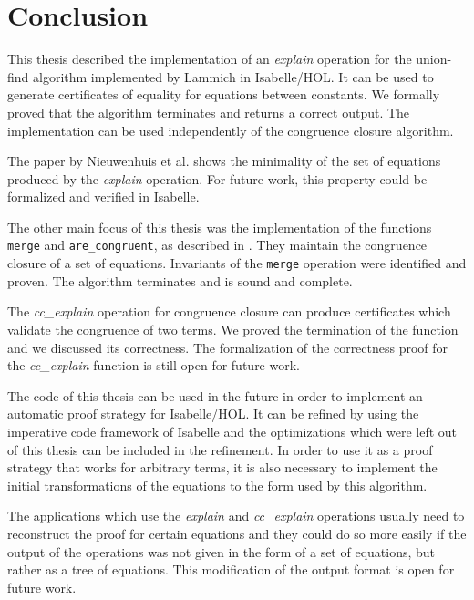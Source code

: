 
\chapter{Conclusion}\label{chapter:conclusion}

This thesis described the implementation of an \emph{explain} operation for the union-find algorithm implemented by Lammich \cite{unionfind-isabelle} in Isabelle/HOL. It can be used to generate certificates of equality for equations between constants. We formally proved that the algorithm terminates and returns a correct output. The implementation can be used independently of the congruence closure algorithm.

The paper by Nieuwenhuis et al. \cite{Nieuwenhuis} shows the minimality of the set of equations produced by the \emph{explain} operation. For future work, this property could be formalized and verified in Isabelle.

The other main focus of this thesis was the implementation of the functions \lstinline|merge| and \lstinline|are_congruent|, as described in \cite{Nieuwenhuis}. They maintain the congruence closure of a set of equations. Invariants of the \lstinline|merge| operation were identified and proven. The algorithm terminates and is sound and complete.

The \emph{cc\_explain} operation for congruence closure can produce certificates which validate the congruence of two terms. We proved the termination of the function and we discussed its correctness.
The formalization of the correctness proof for the \emph{cc\_explain} function is still open for future work.

The code of this thesis can be used in the future in order to implement an automatic proof strategy for Isabelle/HOL. It can be refined by using the imperative code framework of Isabelle \cite{imperativehol} and the optimizations which were left out of this thesis can be included in the refinement. In order to use it as a proof strategy that works for arbitrary terms, it is also necessary to implement the initial transformations of the equations to the form used by this algorithm.

The applications which use the \emph{explain} and \emph{cc\_explain} operations usually need to reconstruct the proof for certain equations and they could do so more easily if the output of the operations was not given in the form of a set of equations, but rather as a tree of equations. This modification of the output format is open for future work.
